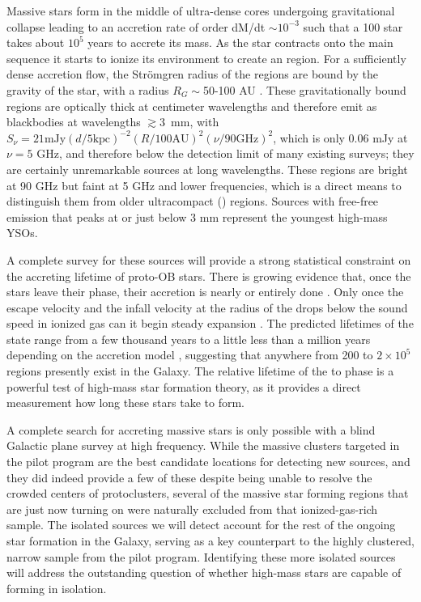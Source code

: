 \documentclass[11pt,preprint]{aastex_nofoot}
\begin{document}
Massive stars form in the middle of ultra-dense cores undergoing gravitational
collapse leading to an accretion rate of order dM/dt $\sim 10^{-3}$ \msun
\peryr such that a 100 \msun star takes about $10^5$ years to accrete its mass.  
As the star contracts onto the main sequence it starts to ionize its
environment to create an \hchii region.  For a sufficiently dense accretion
flow, the Strömgren radius of the \hchii regions are bound by the gravity of
the star, with a radius $R_G \sim$50-100 AU
\citep{Keto2002a,Keto2003a,Keto2007a}.  These gravitationally bound \hchii
regions are optically thick at centimeter wavelengths and therefore emit as
blackbodies at wavelengths $\gtrsim$3~mm, with $S_\nu=21 \textrm{mJy} (d/5
\textrm{kpc})^{-2} (R/100 \textrm{AU})^2(\nu/90 \textrm{GHz})^2$, which is only
0.06 mJy at $\nu=5$ GHz, and therefore below the detection limit of many
existing surveys; they are certainly unremarkable sources at long wavelengths.
These \hchii regions are bright at 90 GHz but faint at 5 GHz and lower
frequencies, which is a direct means to distinguish them from older
ultracompact (\uchii) regions.  Sources
with free-free emission that peaks at or just below 3 mm represent the youngest
high-mass YSOs.

A complete survey for these sources will provide a strong statistical
constraint on the accreting lifetime of proto-OB stars.  There is growing
evidence that, once the stars leave their \hchii phase, their accretion is
nearly or entirely done \citep[e.g.,][]{Goddi2018a}.  Only once the escape
velocity and the infall velocity at the radius of the \hchii drops below the
sound speed in ionized gas can it begin steady expansion \citep{Keto2006a}.
The predicted lifetimes of the \hchii state range from a few thousand years to
a little less than a million years depending on the accretion model
\citep{Keto2003a,Zhang2018a}, suggesting that anywhere from 200 to $2\times10^5$ 
\hchii regions presently exist in the Galaxy.
The relative lifetime of the \hchii to \uchii phase is a powerful
test of high-mass star formation theory, as it provides a direct measurement
how long these stars take to form.


A complete search for accreting massive stars is only possible with a blind
Galactic plane survey at high frequency.  While the massive clusters targeted
in the pilot program are the best candidate locations for detecting new
sources, and they did indeed provide a few of these despite being unable to
resolve the crowded centers of protoclusters, several of the massive star
forming regions that are just now turning on were naturally excluded from that
ionized-gas-rich sample.  The isolated sources we will detect account for the
rest of the ongoing star formation in the Galaxy, serving as a key counterpart
to the highly clustered, narrow sample from the pilot program.  Identifying
these more isolated sources will address the outstanding question of whether
high-mass stars are capable of forming in isolation.
\end{document}
